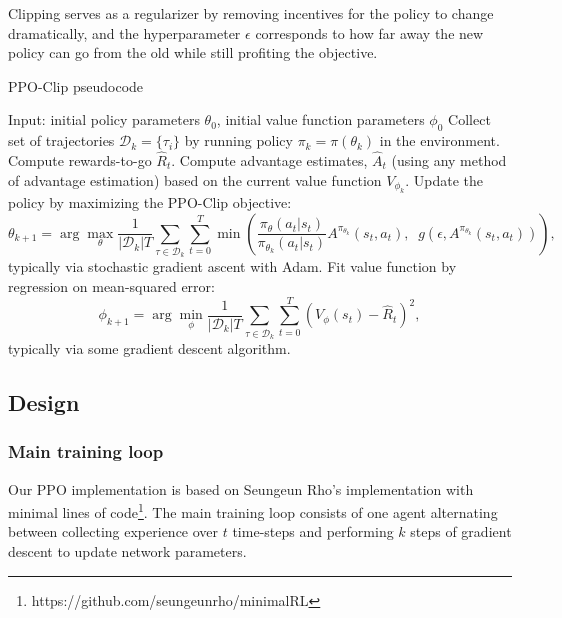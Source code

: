 \documentclass[12pt,a4paper]{article}
\begin{document}
Clipping serves as a regularizer by
removing incentives for the policy to change dramatically, and the
hyperparameter \(\epsilon\) corresponds to how far away the new policy
can go from the old while still profiting the objective. 

\begin{algorithm}[H]
    \caption{PPO-Clip pseudocode}
    \label{alg1}
\begin{algorithmic}[1]
    \STATE Input: initial policy parameters $\theta_0$, initial value function parameters $\phi_0$
    \STATE Collect set of trajectories ${\mathcal D}_k = \{\tau_i\}$ by running policy $\pi_k = \pi(\theta_k)$ in the environment.
    \STATE Compute rewards-to-go $\hat{R}_t$.
    \STATE Compute advantage estimates, $\hat{A}_t$ (using any method of advantage estimation) based on the current value function $V_{\phi_k}$.
    \STATE Update the policy by maximizing the PPO-Clip objective:
        \begin{equation*}
        \theta_{k+1} = \arg \max_{\theta} \frac{1}{|{\mathcal D}_k| T} \sum_{\tau \in {\mathcal D}_k} \sum_{t=0}^T \min\left(
            \frac{\pi_{\theta}(a_t|s_t)}{\pi_{\theta_k}(a_t|s_t)}  A^{\pi_{\theta_k}}(s_t,a_t), \;\;
            g(\epsilon, A^{\pi_{\theta_k}}(s_t,a_t))
        \right),
        \end{equation*}
        typically via stochastic gradient ascent with Adam.
    \STATE Fit value function by regression on mean-squared error:
        \begin{equation*}
        \phi_{k+1} = \arg \min_{\phi} \frac{1}{|{\mathcal D}_k| T} \sum_{\tau \in {\mathcal D}_k} \sum_{t=0}^T\left( V_{\phi} (s_t) - \hat{R}_t \right)^2,
        \end{equation*}
        typically via some gradient descent algorithm.
    \ENDFOR
\end{algorithmic}
\end{algorithm}

\subsection{Design}
\subsubsection{Main training loop}
Our PPO implementation is based on Seungeun Rho's implementation with minimal lines of code\footnote{https://github.com/seungeunrho/minimalRL}. The main training loop consists of one agent alternating between collecting experience over $t$ time-steps and performing $k$ steps of gradient descent to update network parameters. 
\end{document}
